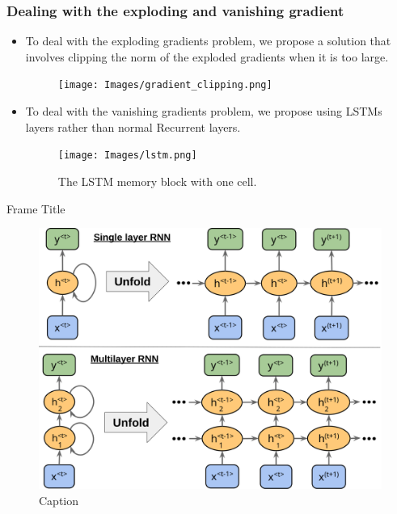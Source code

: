 \documentclass[11pt,]{beamer}
\begin{document}
\begin{frame}
	\frametitle{Dealing with the exploding and vanishing gradient}
	\begin{itemize}
		\item To deal with the exploding gradients problem, we propose a solution that involves clipping the norm of the exploded
		gradients when it is too large.
	\begin{figure}[h]
		\centering
		\texttt{[image: Images/gradient\_clipping.png]}
	\end{figure}
		\item To deal with the vanishing gradients problem, we propose using LSTMs layers rather than normal Recurrent layers.
	\begin{figure}[h]
		\centering
		\texttt{[image: Images/lstm.png]}
		\caption{The LSTM memory block with one cell.}
	\end{figure}
\end{itemize}
\end{frame}
\begin{frame}{Frame Title}
    \begin{figure}
        \centering
        \includegraphics{Images/sing_mul.svg}
        \caption{Caption}
        \label{fig:enter-label}
    \end{figure}
\end{frame}
\end{document}
